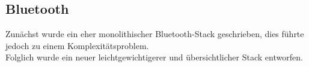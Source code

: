 \documentclass[12pt,a4paper]{article}
\begin{document}
\subsection{Bluetooth}
Zunächst wurde ein eher monolithischer Bluetooth-Stack geschrieben, dies führte jedoch zu einem Komplexitätsproblem.\\
Folglich wurde ein neuer leichtgewichtigerer und übersichtlicher Stack entworfen.
\end{document}
